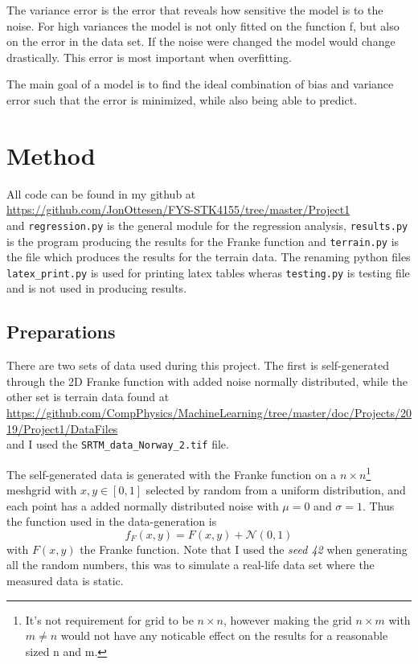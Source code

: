 \documentclass[uio,jmp,amsmath,amssymb,reprint,nofootinbib]{revtex4-1}
\numberwithin{equation}{section}
\begin{document}
The variance error is the error that reveals how sensitive the model is to the noise. For high variances the model is not only fitted on the function f, but also on the error in the data set. If the noise were changed the model would change drastically. This error is most important when overfitting.

The main goal of a model is to find the ideal combination of bias and variance error such that the error is minimized, while also being able to predict.

\section{Method}\label{sec:Method}

All code can be found in my github at\\
\url{https://github.com/JonOttesen/FYS-STK4155/tree/master/Project1}\\
and \texttt{regression.py} is the general module for the regression analysis, \texttt{results.py} is the program producing the results for the Franke function and \texttt{terrain.py} is the file which produces the results for the terrain data. The renaming python files \texttt{latex\_print.py} is used for printing latex tables wheras \texttt{testing.py} is testing file and is not used in producing results.

\subsection{Preparations}

There are two sets of data used during this project. The first is self-generated through the 2D Franke function with added noise normally distributed, while the other set is terrain data found at\\
\url{https://github.com/CompPhysics/MachineLearning/tree/master/doc/Projects/2019/Project1/DataFiles}\\
and I used the \texttt{SRTM\_data\_Norway\_2.tif} file.

The self-generated data is generated with the Franke function on a \(n\times n\)\footnote{It's not requirement for grid to be \(n\times n\), however making the grid \(n\times m\) with \(m\neq n\) would not have any noticable effect on the results for a reasonable sized n and m.} meshgrid with \(x,y\in [0,1]\) selected by random from a uniform distribution, and each point has a added normally distributed noise with \(\mu = 0\) and \(\sigma = 1\). Thus the function used in the data-generation is
\begin{equation}
f_{F}(x,y) = F(x, y) + \mathcal{N}(0,1)
\end{equation}
with \(F(x,y)\) the Franke function. Note that I used the \textit{seed 42} when generating all the random numbers, this was to simulate a real-life data set where the measured data is static.
\end{document}
